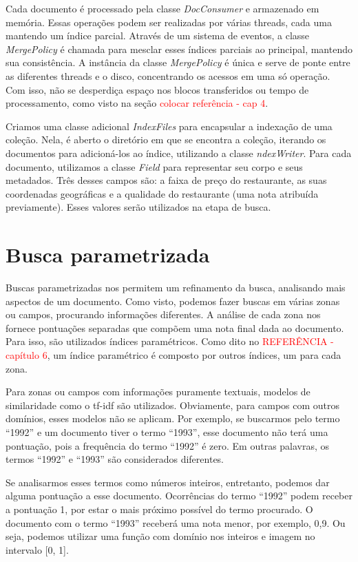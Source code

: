 Cada documento é processado pela classe \emph{DocConsumer} e armazenado em memória. Essas operações podem ser realizadas por várias threads, cada uma mantendo um índice parcial. Através de um sistema de eventos, a classe \emph{MergePolicy} é chamada para mesclar esses índices parciais ao principal, mantendo sua consistência. A instância da classe \emph{MergePolicy} é única e serve de ponte entre as diferentes threads e o disco, concentrando os acessos em uma só operação. Com isso, não se desperdiça espaço nos blocos transferidos ou tempo de processamento, como visto na seção \textcolor{red}{colocar referência - cap 4}. 

Criamos uma classe adicional \emph{IndexFiles} para encapsular a indexação de uma coleção. Nela, é aberto o diretório em que se encontra a coleção, iterando os documentos para adicioná-los ao índice, utilizando a classe \emph{ndexWriter}. Para cada documento, utilizamos a classe \emph{Field} para representar seu corpo e seus metadados. Três desses campos são: a faixa de preço do restaurante, as suas coordenadas geográficas e a qualidade do restaurante (uma nota atribuída previamente). Esses valores serão utilizados na etapa de busca.

\section{Busca parametrizada}
\label{sec:busca_parametrizada}

Buscas parametrizadas nos permitem um refinamento da busca, analisando mais aspectos de um documento. Como visto, podemos fazer buscas em várias zonas ou campos, procurando informações diferentes. A análise de cada zona nos fornece pontuações separadas que compõem uma nota final dada ao documento. Para isso, são utilizados índices paramétricos. Como dito no \textcolor{red}{REFERÊNCIA - capítulo 6}, um índice paramétrico é composto por outros índices, um para cada zona.

Para zonas ou campos com informações puramente textuais, modelos de similaridade como o tf-idf são utilizados. Obviamente, para campos com outros domínios, esses modelos não se aplicam. Por exemplo, se buscarmos pelo termo ``1992'' e um documento tiver o termo ``1993'', esse documento não terá uma pontuação, pois a frequência do termo ``1992'' é zero.  Em outras palavras, os termos ``1992'' e ``1993'' são considerados diferentes.

Se analisarmos esses termos como números inteiros, entretanto, podemos dar alguma pontuação a esse documento. Ocorrências do termo ``1992'' podem receber a pontuação 1, por estar o mais próximo possível do termo procurado. O documento com o termo ``1993'' receberá uma nota menor, por exemplo, 0,9. Ou seja, podemos utilizar uma função com domínio nos inteiros e imagem no intervalo [0, 1].

